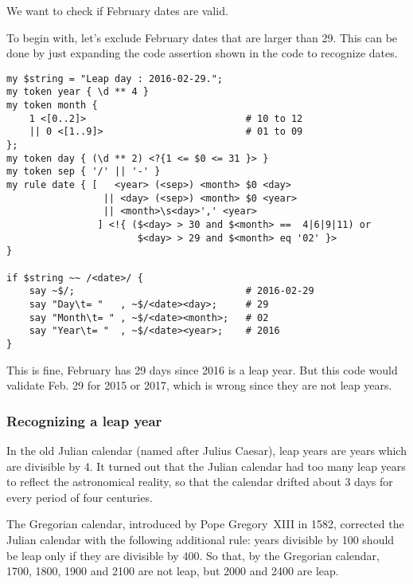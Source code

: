 We want to check if February dates are valid.

To begin with, let's exclude February dates that are 
larger than 29. This can be done by just expanding the 
code assertion shown in the code to recognize dates.

\begin{verbatim}
my $string = "Leap day : 2016-02-29.";                                         
my token year { \d ** 4 }                                        
my token month {   
    1 <[0..2]>                            # 10 to 12                     
    || 0 <[1..9]>                         # 01 to 09                     
};
my token day { (\d ** 2) <?{1 <= $0 <= 31 }> }  
my token sep { '/' || '-' }                                                 
my rule date { [   <year> (<sep>) <month> $0 <day> 
                 || <day> (<sep>) <month> $0 <year> 
                 || <month>\s<day>',' <year>
                ] <!{ ($<day> > 30 and $<month> ==  4|6|9|11) or 
                       $<day> > 29 and $<month> eq '02' }>
}                         

if $string ~~ /<date>/ {
    say ~$/;                              # 2016-02-29
    say "Day\t= "   , ~$/<date><day>;     # 29
    say "Month\t= " , ~$/<date><month>;   # 02
    say "Year\t= "  , ~$/<date><year>;    # 2016
}                    
\end{verbatim}

This is fine, February has 29 days since 2016 is a leap 
year. But this code would validate Feb. 29 for 2015 or 
2017, which is wrong since they are not leap years.

\subsubsection{Recognizing a leap year}

In the old Julian calendar (named after Julius Caesar), 
leap years are years which are divisible by 4. It turned 
out that the Julian calendar had too many leap years 
to reflect the astronomical reality, so that the 
calendar drifted about 3 days for every period of four 
centuries.

The Gregorian calendar, introduced by Pope Gregory~XIII 
in 1582, corrected the Julian calendar with 
the following additional rule: years divisible by 100 should 
be leap only if they are divisible by 400. So that, by the 
Gregorian calendar, 1700, 1800, 1900 and 2100 are not leap, 
but 2000 and 2400 are leap.

